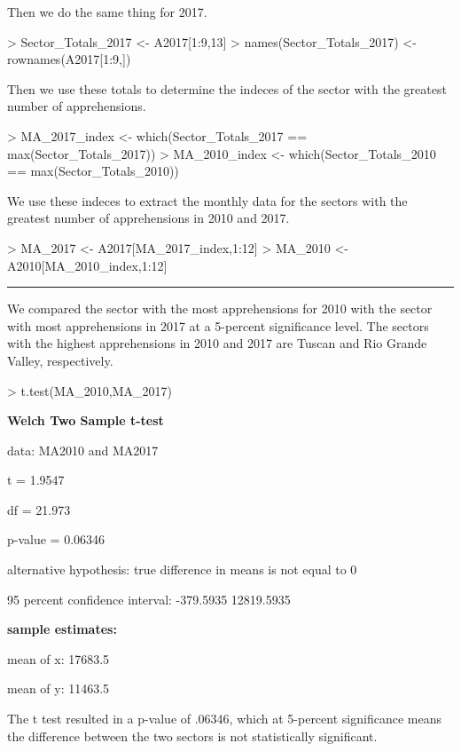 \documentclass[letterpaper]{article}
\begin{document}
Then we do the same thing for 2017.
\begin{Schunk}
\begin{Sinput}
> Sector_Totals_2017 <- A2017[1:9,13]
> names(Sector_Totals_2017) <- rownames(A2017[1:9,])
\end{Sinput}
\end{Schunk}

Then we use these totals to determine the indeces of the sector with the greatest number of apprehensions. 
\begin{Schunk}
\begin{Sinput}
> MA_2017_index <- which(Sector_Totals_2017 == max(Sector_Totals_2017))
> MA_2010_index <- which(Sector_Totals_2010 == max(Sector_Totals_2010))
\end{Sinput}
\end{Schunk}

We use these indeces to extract the monthly data for the sectors with the greatest number of apprehensions in 2010 and 2017.
\begin{Schunk}
\begin{Sinput}
> MA_2017 <- A2017[MA_2017_index,1:12]
> MA_2010 <- A2010[MA_2010_index,1:12]
\end{Sinput}
\end{Schunk}

\noindent\rule{\textwidth}{0.4pt}
\medskip

We compared the sector with the most apprehensions for 2010 with the sector with most apprehensions in 2017 at a 5-percent significance level. The sectors with the highest apprehensions in 2010 and 2017 are Tuscan and Rio Grande Valley, respectively. 

\begin{Schunk}
\begin{Sinput}
> t.test(MA_2010,MA_2017)
\end{Sinput}
\end{Schunk}

\textbf{Welch Two Sample t-test}

data: MA2010 and MA2017\par
t = 1.9547\par
df = 21.973\par
p-value = 0.06346\par
alternative hypothesis: true difference in means is not equal to 0\par
95 percent confidence interval: -379.5935  12819.5935\par
\par
\bigskip
\textbf{sample estimates:}\par
mean of x: 17683.5\par
mean of y: 11463.5\par
\bigskip
The t test resulted in a p-value of .06346, which at 5-percent significance means the difference between the two sectors is not statistically significant.\par
\medskip
\end{document}
